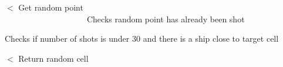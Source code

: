 $<$ Get random point ~\newline
~\newline
~\newline
~\newline
~\newline
~\newline
~\newline
~\newline
~\newline
~\newline
~\newline
~\newline
~\newline
~\newline
~\newline
~\newline
~\newline
~\newline
~\newline
~\newline
~\newline
~\newline
~\newline
~\newline
~\newline
~\newline
~\newline
~\newline
~\newline
~\newline
~\newline
~\newline
~\newline
~\newline
~\newline
~\newline
~\newline
~\newline
~\newline
~\newline
~\newline
~\newline
~\newline
 Checks random point has already been shot

Checks if number of shots is under 30 and there is a ship close to target cell

$<$ Return random cell

